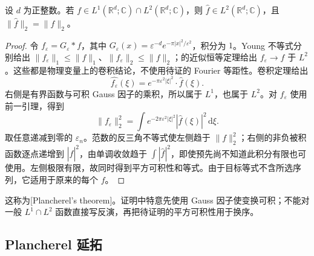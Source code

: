 \begin{theorem}\label{b2:thm:04-plancherel-core}
设 \(d\) 为正整数。若 \(f\in L^1(\mathbb R^d;\mathbb C)\cap L^2(\mathbb R^d;\mathbb C)\)，则 \(\widehat f\in L^2(\mathbb R^d;\mathbb C)\)，且 \(\|\widehat f\|_2=\|f\|_2\)。
\end{theorem}
\begin{proof}
令 \(f_\varepsilon=G_\varepsilon*f\)，其中 \(G_\varepsilon(x)=\varepsilon^{-d}e^{-\pi|x|^2/\varepsilon^2}\)，积分为 \(1\)。Young 不等式分别给出 \(\|f_\varepsilon\|_1\leq\|f\|_1\)、\(\|f_\varepsilon\|_2\leq\|f\|_2\)；的近似恒等定理给出 \(f_\varepsilon\to f\) 于 \(L^2\)。这些都是物理变量上的卷积结论，不使用待证的 Fourier 等距性。卷积定理给出
\[
 \widehat {f_\varepsilon}(\xi)
 =e^{-\pi\varepsilon^2|\xi|^2}\cdot\widehat f(\xi).
\]
右侧是有界函数与可积 Gauss 因子的乘积，所以属于 \(L^1\)，也属于 \(L^2\)。对 \(f_\varepsilon\) 使用前一引理，得到
\[
 \|f_\varepsilon\|_2^2
 =\int e^{-2\pi\varepsilon^2|\xi|^2}|\widehat f(\xi)|^2\,\mathrm{d}\xi.
\]
取任意递减到零的 \(\varepsilon_n\)。范数的反三角不等式使左侧趋于 \(\|f\|_2^2\)；右侧的非负被积函数逐点递增到 \(|\widehat f|^2\)，由单调收敛趋于 \(\int|\widehat f|^2\)，即使预先尚不知道此积分有限也可使用。左侧极限有限，故同时得到平方可积性和等式。由于目标等式不含所选序列，它适用于原来的每个 \(f\)。
\end{proof}

这称为[Plancherel's theorem]。证明中特意先使用 Gauss 因子使变换可积；不能对一般 \(L^1\cap L^2\) 函数直接写反演，再把待证明的平方可积性用于换序。

\subsection{Plancherel 延拓}
\label{b2:subsec:040102}

